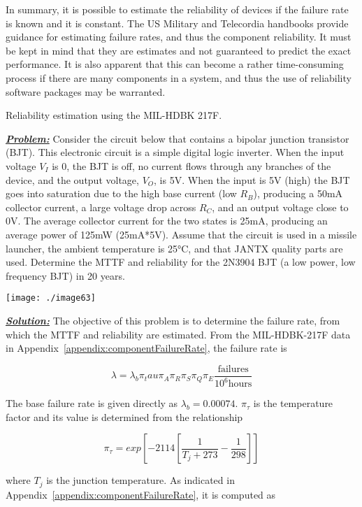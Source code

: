 {In summary, it is possible to estimate the reliability of devices if the
failure rate is known and it is constant. The US Military and Telecordia
handbooks provide guidance for estimating failure rates, and thus the
component reliability. It must be kept in mind that they are estimates
and not guaranteed to predict the exact performance. It is also apparent
that this can become a rather time-consuming process if there are many
components in a system, and thus the use of reliability software
packages may be warranted.

\begin{example}{Reliability estimation using the MIL-HDBK 217F.}
\label{example:systemReliabilityEstimationUsingMIL}

\emph{\textbf{\ul{Problem:}}} Consider the circuit below that contains a
bipolar junction transistor (BJT). This electronic circuit is a simple
digital logic inverter. When the input voltage $V_I$ is 0, 
the BJT is off, no current
flows through any branches of the device, and the output voltage,
$V_O$, is 5V. When the input is 5V
(high) the BJT goes into saturation due to the high base current (low
$R_B$), producing a 50mA collector
current, a large voltage drop across $R_C$, and an output
voltage close to 0V. The average collector current for the two states is
25mA, producing an average power of 125mW (25mA*5V). Assume that the
circuit is used in a missile launcher, the ambient temperature is 25°C,
and that JANTX quality parts are used. Determine the MTTF and
reliability for the 2N3904 BJT (a low power, low frequency BJT) in 20
years.

\texttt{[image: ./image63]}


\emph{\textbf{\ul{Solution:}}} The objective of this problem is to
determine the failure rate, from which the MTTF and reliability are
estimated. From the MIL-HDBK-217F data in 
Appendix~\ref{appendix:componentFailureRate}, the failure rate
is


$$\lambda=\lambda_b \pi_tau \pi_A \pi_R \pi_S \pi_Q \pi_E \frac{\text{failures}}{10^6 \text{hours}}$$


The base failure rate is given directly as
$\lambda_b = 0.00074$.   $\pi_\tau$ is the temperature factor and
its value is determined from the relationship

$$\pi_\tau = exp [-2114 [ \frac{1}{T_j + 273} - \frac{1}{298} ] ]$$

where $T_j$ is the junction temperature. As
indicated in
 Appendix~\ref{appendix:componentFailureRate}, it is computed as


\end{example}}
